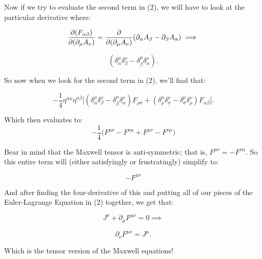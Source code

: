 \documentclass{article}
\newcommand{\pmu}[1]{\partial_{#1}}
\begin{document}
Now if we try to evaluate the second term in (2), we will have to look at the particular derivative where:

\[
     \pdv{(F_{\alpha\beta})}{(\pmu{\mu} A_{\nu})} = 
     \pdv{(\pmu{\mu}A_{\nu})} (\pmu{\alpha} A_{\beta} - \pmu{\beta} A_{\alpha}) \implies
\] 

\[
    (\delta^{\mu}_{\alpha}\delta^{\nu}_{\beta} - \delta^{\mu}_{\beta}\delta^{\nu}_{\alpha})
.\] 

So now when we look for the second term in (2), we'll find that:

\[
    -\frac{1}{4} \eta^{\alpha \rho} \eta^{\sigma \beta}\Bigg[ (\delta^{\mu}_{\alpha}\delta^{\nu}_{\beta} - \delta^{\mu}_{\beta}\delta^{\nu}_{\alpha})F_{\rho\sigma} + (\delta^{\mu}_{\rho}\delta^{\nu}_{\sigma} - \delta^{\mu}_{\sigma}\delta^{\nu}_{\rho}) F_{\alpha\beta}\Bigg]
.\] 

Which then evaluates to:
\[
    -\frac{1}{4} \Big( F^{\mu\nu} - F^{\nu\mu} + F^{\mu\nu} - F^{\nu\mu}\Big)
\] 

Bear in mind that the Maxwell tensor is anti-symmetric; that is, $F^{\mu\nu} = - F^{\nu\mu}$. So this entire term will (either satisfyingly or frustratingly) simplify to:

\[
    -F^{\mu\nu}
\]

And after finding the four-derivative of this and putting all of our pieces of the Euler-Lagrange Equation in (2) together, we get that:

\[
    J^{\nu} + \pmu{\mu} F^{\mu\nu} = 0 \implies
\] 

\begin{equation}
    \pmu{\nu} F^{\mu\nu} = J^{\mu}.
\end{equation}

Which is the tensor version of the Maxwell equations!
\end{document}
